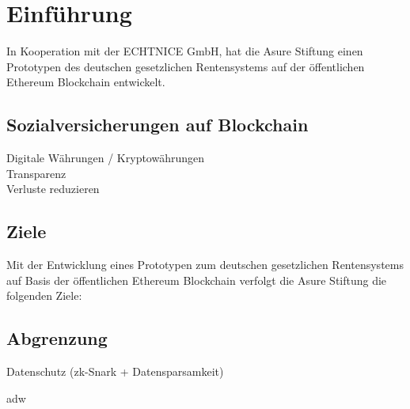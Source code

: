 \section{Einführung}
In Kooperation mit der ECHTNICE GmbH, hat die Asure Stiftung einen Prototypen des deutschen gesetzlichen Rentensystems auf der öffentlichen Ethereum Blockchain entwickelt.

\subsection{Sozialversicherungen auf Blockchain}
Digitale Währungen / Kryptowährungen\\
Transparenz\\
Verluste reduzieren\\

\subsection{Ziele}
Mit der Entwicklung eines Prototypen zum deutschen gesetzlichen Rentensystems auf Basis der öffentlichen Ethereum Blockchain verfolgt die Asure Stiftung die folgenden Ziele:

\subsection{Abgrenzung}
Datenschutz (zk-Snark + Datensparsamkeit)

adw \cite{noauthor_universal_2017}